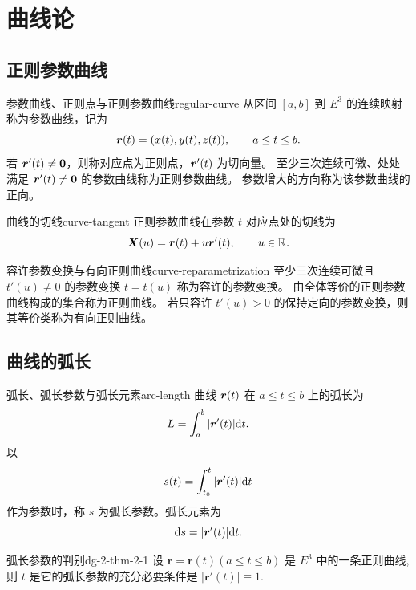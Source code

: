 \chapter{曲线论}
\section{正则参数曲线}

\begin{definition}{参数曲线、正则点与正则参数曲线}{regular-curve}
从区间 $[a,b]$ 到 $E^3$ 的连续映射称为参数曲线，记为
\[
\boldsymbol{r}(t)=(x(t),y(t),z(t)),\qquad a\leq t\leq b.
\]
若 $\boldsymbol{r}'(t)\neq\boldsymbol{0}$，则称对应点为正则点，$\boldsymbol{r}'(t)$ 为切向量。
至少三次连续可微、处处满足 $\boldsymbol{r}'(t)\neq\boldsymbol{0}$ 的参数曲线称为正则参数曲线。
参数增大的方向称为该参数曲线的正向。
\end{definition}

\begin{definition}{曲线的切线}{curve-tangent}
正则参数曲线在参数 $t$ 对应点处的切线为
\[
\boldsymbol{X}(u)=\boldsymbol{r}(t)+u\boldsymbol{r}'(t),\qquad u\in\mathbb{R}.
\]
\end{definition}

\begin{definition}{容许参数变换与有向正则曲线}{curve-reparametrization}
至少三次连续可微且 $t'(u)\neq0$ 的参数变换 $t=t(u)$ 称为容许的参数变换。
由全体等价的正则参数曲线构成的集合称为正则曲线。
若只容许 $t'(u)>0$ 的保持定向的参数变换，则其等价类称为有向正则曲线。
\end{definition}

\section{曲线的弧长}

\begin{definition}{弧长、弧长参数与弧长元素}{arc-length}
曲线 $\boldsymbol{r}(t)$ 在 $a\leq t\leq b$ 上的弧长为
\[
L=\int_a^b|\boldsymbol{r}'(t)|\mathrm{d} t.
\]
以
\[
s(t)=\int_{t_0}^t|\boldsymbol{r}'(t)|\mathrm{d} t
\]
作为参数时，称 $s$ 为弧长参数。弧长元素为
\[
\mathrm{d} s=|\boldsymbol{r}'(t)|\mathrm{d} t.
\]
\end{definition}

\begin{theorem}{弧长参数的判别}{dg-2-thm-2-1}
设 \(\boldsymbol{r} = \boldsymbol{r}(t)(a \leqslant t \leqslant b)\) 是 \(E^3\) 中的一条正则曲线, 则 \(t\) 是它的弧长参数的充分必要条件是 \(|\boldsymbol{r}'(t)| \equiv 1\).
\end{theorem}

